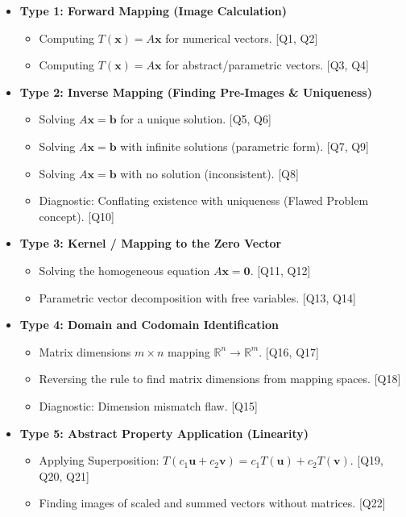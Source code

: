 \documentclass{article}
\begin{document}
\begin{itemize}
    \item \textbf{Type 1: Forward Mapping (Image Calculation)}
    \begin{itemize}
        \item Computing $T(\mathbf{x}) = A\mathbf{x}$ for numerical vectors. [Q1, Q2]
        \item Computing $T(\mathbf{x}) = A\mathbf{x}$ for abstract/parametric vectors. [Q3, Q4]
    \end{itemize}
    
    \item \textbf{Type 2: Inverse Mapping (Finding Pre-Images \& Uniqueness)}
    \begin{itemize}
        \item Solving $A\mathbf{x} = \mathbf{b}$ for a unique solution. [Q5, Q6]
        \item Solving $A\mathbf{x} = \mathbf{b}$ with infinite solutions (parametric form). [Q7, Q9]
        \item Solving $A\mathbf{x} = \mathbf{b}$ with no solution (inconsistent). [Q8]
        \item Diagnostic: Conflating existence with uniqueness (Flawed Problem concept). [Q10]
    \end{itemize}
    
    \item \textbf{Type 3: Kernel / Mapping to the Zero Vector}
    \begin{itemize}
        \item Solving the homogeneous equation $A\mathbf{x} = \mathbf{0}$. [Q11, Q12]
        \item Parametric vector decomposition with free variables. [Q13, Q14]
    \end{itemize}
    
    \item \textbf{Type 4: Domain and Codomain Identification}
    \begin{itemize}
        \item Matrix dimensions $m \times n$ mapping $\mathbb{R}^n \to \mathbb{R}^m$. [Q16, Q17]
        \item Reversing the rule to find matrix dimensions from mapping spaces. [Q18]
        \item Diagnostic: Dimension mismatch flaw. [Q15]
    \end{itemize}
    
    \item \textbf{Type 5: Abstract Property Application (Linearity)}
    \begin{itemize}
        \item Applying Superposition: $T(c_1\mathbf{u} + c_2\mathbf{v}) = c_1T(\mathbf{u}) + c_2T(\mathbf{v})$. [Q19, Q20, Q21]
        \item Finding images of scaled and summed vectors without matrices. [Q22]
    \end{itemize}
    

\end{itemize}
\end{document}
